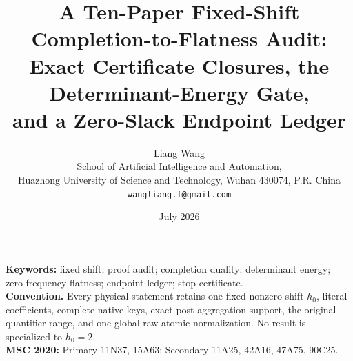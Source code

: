 \documentclass[11pt]{article}
\title{A Ten-Paper Fixed-Shift Completion-to-Flatness Audit:\\
Exact Certificate Closures, the Determinant-Energy Gate,\\
and a Zero-Slack Endpoint Ledger}
\author{Liang Wang\\
School of Artificial Intelligence and Automation,\\
Huazhong University of Science and Technology, Wuhan 430074, P.R. China\\
\texttt{wangliang.f@gmail.com}}
\date{July 2026}
\theoremstyle{remark}
\begin{document}
\maketitle


\noindent\textbf{Keywords:} fixed shift; proof audit; completion
duality; determinant energy; zero-frequency flatness; endpoint
ledger; stop certificate.\\[0.5em]
\noindent\textbf{Convention.} Every physical statement retains one
fixed nonzero shift \(h_0\), literal coefficients, complete native
keys, exact post-aggregation support, the original quantifier range,
and one global raw atomic normalization.  No result is specialized
to \(h_0=2\).\\[0.5em]
\noindent\textbf{MSC 2020:} Primary 11N37, 15A63; Secondary 11A25,
42A16, 47A75, 90C25.














\begingroup
\small
\raggedright


\endgroup
\end{document}
